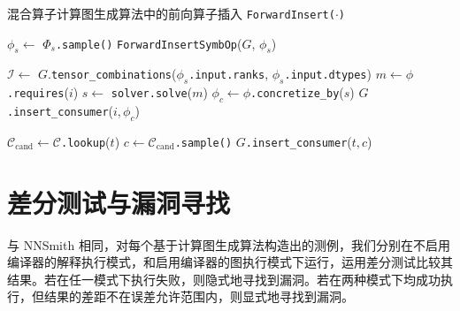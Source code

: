 \begin{algorithm}
    \caption{混合算子计算图生成算法中的前向算子插入 \texttt{ForwardInsert($\cdot$)}}
    \label{algo:hygen}


 {
     {
        $\phi_s \gets$ $\Phi_s$\texttt{.sample()}\;
        \texttt{ForwardInsertSymbOp}($G$, $\phi_s$)\;
    }
}

 {
    $\mathcal{I} \gets$ $G$.\texttt{tensor\_combinations}($\phi_s$\texttt{.input.ranks}, $\phi_s$\texttt{.input.dtypes})\;
     {
        $m \gets \phi$\texttt{.requires}($i$)\;
        $s \gets$ \texttt{solver.solve}($m$)\;
         {
            $\phi_c \gets \phi$\texttt{.concretize\_by}($s$)\;
            $G$\texttt{.insert\_consumer}($i, \phi_c$)\;
        }
    }
}

 {
     {
        $\mathcal{C}_\text{cand} \gets \mathcal{C}$\texttt{.lookup}($t$)\;
        $c \gets \mathcal{C}_\text{cand}$\texttt{.sample()}\;
        $G$\texttt{.insert\_consumer}($t, c$)\;
    }
}

\end{algorithm}

\section{差分测试与漏洞寻找}

与 NNSmith 相同，对每个基于计算图生成算法构造出的测例，我们分别在不启用编译器的解释执行模式，和启用编译器的图执行模式下运行，运用差分测试比较其结果。若在任一模式下执行失败，则隐式地寻找到漏洞。若在两种模式下均成功执行，但结果的差距不在误差允许范围内，则显式地寻找到漏洞。
